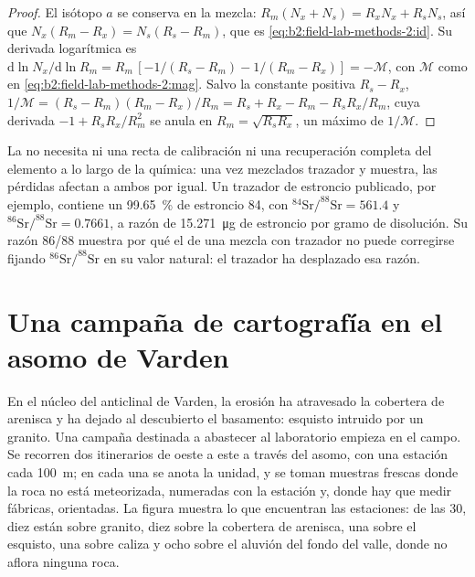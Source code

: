 \begin{proof}
El isótopo $a$ se conserva en la mezcla: $R_m(N_x + N_s) = R_x N_x + R_s N_s$, así que $N_x(R_m - R_x) =
N_s(R_s - R_m)$, que es \eqref{eq:b2:field-lab-methods-2:id}. Su derivada logarítmica es
$\mathrm{d}\ln N_x/\mathrm{d}\ln R_m = R_m\,[-1/(R_s - R_m) - 1/(R_m - R_x)] = -\mathcal{M}$, con
$\mathcal{M}$ como en \eqref{eq:b2:field-lab-methods-2:mag}. Salvo la constante positiva $R_s - R_x$,
$1/\mathcal{M} = (R_s - R_m)(R_m - R_x)/R_m = R_s + R_x - R_m - R_sR_x/R_m$, cuya derivada
$-1 + R_sR_x/R_m^2$ se anula en $R_m = \sqrt{R_sR_x}$, un máximo de $1/\mathcal{M}$.
\end{proof}

La  no necesita ni una recta de calibración ni una recuperación completa del elemento a lo largo de
la química: una vez mezclados trazador y muestra, las pérdidas afectan a ambos por igual. Un trazador de estroncio
publicado, por ejemplo, contiene un \qty{99.65}{\percent} de estroncio 84, con
$^{84}\mathrm{Sr}/^{88}\mathrm{Sr} = 561.4$ y $^{86}\mathrm{Sr}/^{88}\mathrm{Sr} = 0.7661$, a razón de
\qty{15.271}{\micro\gram} de estroncio por gramo de disolución. Su razón 86/88 muestra por qué el  de una mezcla con trazador no puede corregirse fijando $^{86}\mathrm{Sr}/^{88}\mathrm{Sr}$ en su
valor natural: el trazador ha desplazado esa razón.

\section{Una campaña de cartografía en el asomo de Varden}\label{sec:b2:field-lab-methods-2:campaign}

En el núcleo del anticlinal de Varden, la erosión ha atravesado la cobertera de arenisca y ha dejado al descubierto el
basamento: esquisto intruido por un granito. Una campaña destinada a abastecer al laboratorio empieza en el
campo. Se recorren dos itinerarios de oeste a este a través del asomo, con una estación cada
\qty{100}{m}; en cada una se anota la unidad, y se toman muestras frescas donde la roca no está
meteorizada, numeradas con la estación y, donde hay que medir fábricas, orientadas. La figura
muestra lo que encuentran las estaciones: de las 30, diez están sobre granito, diez sobre la cobertera de arenisca, una sobre
el esquisto, una sobre caliza y ocho sobre el aluvión del fondo del valle, donde no aflora
ninguna roca.

